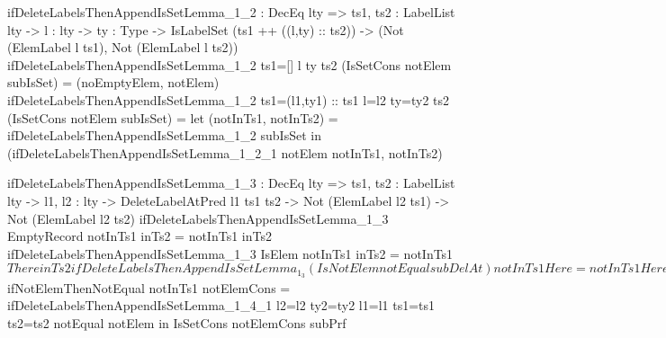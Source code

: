 \begin{code}
ifDeleteLabelsThenAppendIsSetLemma_1_2 : DecEq lty => 
  {ts1, ts2 : LabelList lty} -> {l : lty} -> {ty : Type} ->
  IsLabelSet (ts1 ++ ((l,ty) :: ts2)) -> 
  (Not (ElemLabel l ts1), Not (ElemLabel l ts2))  
ifDeleteLabelsThenAppendIsSetLemma_1_2 {ts1=[]} {l} {ty} {ts2} 
  (IsSetCons notElem subIsSet) = (noEmptyElem, notElem)
ifDeleteLabelsThenAppendIsSetLemma_1_2 {ts1=(l1,ty1) :: ts1} 
  {l=l2} {ty=ty2} {ts2} (IsSetCons notElem subIsSet) = 
  let (notInTs1, notInTs2) = 
        ifDeleteLabelsThenAppendIsSetLemma_1_2 subIsSet
  in (ifDeleteLabelsThenAppendIsSetLemma_1_2_1 notElem notInTs1, 
       notInTs2)

ifDeleteLabelsThenAppendIsSetLemma_1_3 : DecEq lty => 
  {ts1, ts2 : LabelList lty} -> {l1, l2 : lty} ->
  DeleteLabelAtPred l1 ts1 ts2 -> Not (ElemLabel l2 ts1) -> 
  Not (ElemLabel l2 ts2)
ifDeleteLabelsThenAppendIsSetLemma_1_3 EmptyRecord notInTs1 inTs2 = 
  notInTs1 inTs2
ifDeleteLabelsThenAppendIsSetLemma_1_3 IsElem notInTs1 inTs2 = 
  notInTs1 $ There inTs2
ifDeleteLabelsThenAppendIsSetLemma_1_3 
  (IsNotElem notEqual subDelAt) notInTs1 Here = notInTs1 Here
ifDeleteLabelsThenAppendIsSetLemma_1_3 {l1} {l2} 
  {ts1=((l3,ty3) :: ts1)} {ts2=((l3,ty3) :: ts2)} 
  (IsNotElem notEqual subDelAt) notInTs1 (There inTs2) =
  let subPrf = ifDeleteLabelsThenAppendIsSetLemma_1_3 {l1=l1} 
        {ts1=ts1} {ts2=ts2} subDelAt (notElemInCons notInTs1)
  in subPrf inTs2

ifDeleteLabelsThenAppendIsSetLemma_1_4_1 : DecEq lty => 
  {ts1, ts2 : LabelList lty} -> {l1, l2 : lty} -> {ty2 : Type} ->
  Not (l1 = l2) -> Not (ElemLabel l1 (ts1 ++ ts2)) -> 
  Not (ElemLabel l1 (ts1 ++ ((l2,ty2) :: ts2)))
ifDeleteLabelsThenAppendIsSetLemma_1_4_1 {ts1=[]} notEqual 
  notInAppend Here = notEqual Refl
ifDeleteLabelsThenAppendIsSetLemma_1_4_1 {ts1=[]} notEqual 
  notInAppend (There isThere) = notInAppend isThere
ifDeleteLabelsThenAppendIsSetLemma_1_4_1 {l1} {l2} 
  {ts1=(l1,ty3) :: ts1} notEqual notInAppend Here = notInAppend Here
ifDeleteLabelsThenAppendIsSetLemma_1_4_1 {l1} {l2} 
  {ts1=(l3,ty3) :: ts1} {ts2=ts2} {ty2=ty2} notEqual notInAppend 
  (There isThere) = 
  let subPrf = ifDeleteLabelsThenAppendIsSetLemma_1_4_1 {l1=l1} 
        {l2=l2} {ts1=ts1} {ts2=ts2} {ty2=ty2} notEqual 
        (notElemInCons notInAppend)
  in subPrf isThere

ifDeleteLabelsThenAppendIsSetLemma_1_4 : DecEq lty => 
  {ts1, ts2 : LabelList lty} -> {l : lty} -> {ty : Type} ->
  IsLabelSet (ts1 ++ ts2) -> Not (ElemLabel l ts1) -> 
  Not (ElemLabel l ts2) -> IsLabelSet (ts1 ++ ((l,ty) :: ts2))
ifDeleteLabelsThenAppendIsSetLemma_1_4 {ts1=[]} isSet notInTs1 
  notInTs2 = IsSetCons notInTs2 isSet
ifDeleteLabelsThenAppendIsSetLemma_1_4 {l=l2} {ty=ty2} 
  {ts1=(l1,ty1) :: ts1} {ts2} (IsSetCons notElem isSet) 
  notInTs1 notInTs2 = 
  let subPrf = ifDeleteLabelsThenAppendIsSetLemma_1_4 {l=l2} 
        {ty=ty2} isSet (notElemInCons notInTs1) notInTs2
      notEqual = symNot $ ifNotElemThenNotEqual notInTs1
      notElemCons = ifDeleteLabelsThenAppendIsSetLemma_1_4_1 
        {l2=l2} {ty2=ty2} {l1=l1} {ts1=ts1} {ts2=ts2} notEqual 
        notElem
  in IsSetCons notElemCons subPrf


\end{code}
